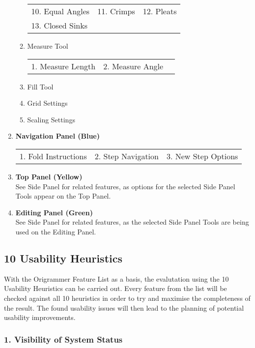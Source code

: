 \begin{enumerate}
\begin{enumerate}
\begin{tabular}{l l l}
        10. Equal Angles & 11. Crimps & 12. Pleats \\
        13. Closed Sinks
        \end{tabular}
        \item Measure Tool \\
        \begin{tabular}{l l l}
        1. Measure Length & 2. Measure Angle \\
        \end{tabular}
        \item Fill Tool
        \item Grid Settings
        \item Scaling Settings
    \end{enumerate}
\item \textbf{Navigation Panel (Blue)} \\
\begin{tabular}{l l l}
1. Fold Instructions & 2. Step Navigation & 3. New Step Options \\
\end{tabular}
\item \textbf{Top Panel (Yellow)} \\
See Side Panel for related features, as options for the selected Side Panel Tools appear on the Top Panel.
\item \textbf{Editing Panel (Green)} \\
See Side Panel for related features, as the selected Side Panel Tools are being used on the Editing Panel.
\end{enumerate}


\subsection{10 Usability Heuristics}
\label{sec:usabilityHeuristics}

With the Origrammer Feature List as a basis, the evalutation using the 10 Usability Heuristics can be carried out. Every feature from the list will be checked against all 10 heuristics in order to try and maximise the completeness of the result. The found usability issues will then lead to the planning of potential usability improvements.




\subsubsection*{1. Visibility of System Status}
\label{sec:visivility}


